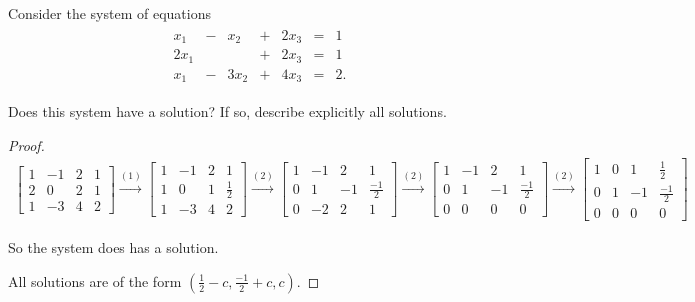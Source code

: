\begin{exercise}
    Consider the system of equations
    \begingroup{}
    \allowdisplaybreaks{}
    \begin{align*}
        \begin{array}{ccccccc}
            x_{1}    & - & x_{2}    & + & 2{x}_{3} & = & 1  \\
            2{x}_{1} &   &          & + & 2x_{3}   & = & 1  \\
            x_{1}    & - & 3{x}_{2} & + & 4{x}_{3} & = & 2.
        \end{array}
    \end{align*}
    \endgroup{}

    Does this system have a solution? If so, describe explicitly all solutions.
\end{exercise}

\begin{proof}
    \begingroup{}
    \allowdisplaybreaks{}
    \begin{align*}
        \left[\begin{array}{ccc|c}
                      1 & -1 & 2 & 1 \\
                      2 & 0  & 2 & 1 \\
                      1 & -3 & 4 & 2
                  \end{array}\right]
        \stackrel{(1)}{\rightarrow}
        \left[\begin{array}{ccc|c}
                      1 & -1 & 2 & 1           \\
                      1 & 0  & 1 & \frac{1}{2} \\
                      1 & -3 & 4 & 2
                  \end{array}\right]
        \stackrel{(2)}{\rightarrow}
        \left[\begin{array}{ccc|c}
                      1 & -1 & 2  & 1            \\
                      0 & 1  & -1 & \frac{-1}{2} \\
                      0 & -2 & 2  & 1
                  \end{array}\right]
        \stackrel{(2)}{\rightarrow}
        \left[\begin{array}{ccc|c}
                      1 & -1 & 2  & 1            \\
                      0 & 1  & -1 & \frac{-1}{2} \\
                      0 & 0  & 0  & 0
                  \end{array}\right]
        \stackrel{(2)}{\rightarrow}
        \left[\begin{array}{ccc|c}
                      1 & 0 & 1  & \frac{1}{2}  \\
                      0 & 1 & -1 & \frac{-1}{2} \\
                      0 & 0 & 0  & 0
                  \end{array}\right]
    \end{align*}
    \endgroup{}

    So the system does has a solution.

    All solutions are of the form $(\frac{1}{2} - c, \frac{-1}{2} + c , c)$.
\end{proof}

